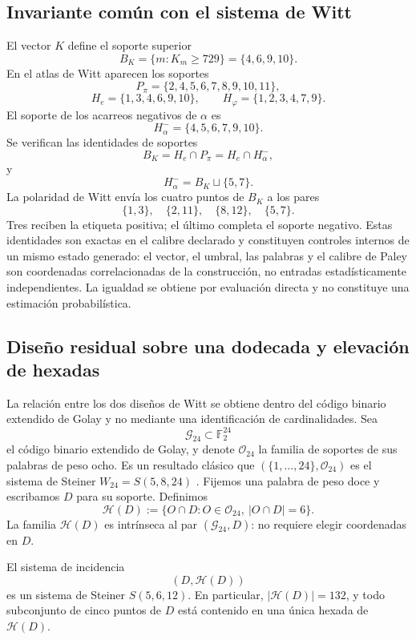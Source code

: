 \subsection{Invariante común con el sistema de Witt}

El vector \(K\) define el soporte superior
\[
B_K=\{m:K_m\ge729\}=\{4,6,9,10\}.
\]
En el atlas de Witt aparecen los soportes
\[
P_\pi=\{2,4,5,6,7,8,9,10,11\},
\]
\[
H_e=\{1,3,4,6,9,10\},
\qquad
H_\varphi=\{1,2,3,4,7,9\}.
\]
El soporte de los acarreos negativos de \(\alpha\) es
\[
H_\alpha^-=\{4,5,6,7,9,10\}.
\]
Se verifican las identidades de soportes
\[
\boxed{
B_K=H_e\cap P_\pi=H_e\cap H_\alpha^-,}
\]
y
\[
\boxed{H_\alpha^-=B_K\sqcup\{5,7\}.}
\]
La polaridad de Witt envía los cuatro puntos de \(B_K\) a los pares
\[
\{1,3\},\quad\{2,11\},\quad\{8,12\},\quad\{5,7\}.
\]
Tres reciben la etiqueta positiva; el último completa el soporte negativo.
Estas identidades son exactas en el calibre declarado y constituyen controles
internos de un mismo estado generado: el vector, el umbral, las palabras y el
calibre de Paley son coordenadas correlacionadas de la construcción, no
entradas estadísticamente independientes. La igualdad se obtiene por
evaluación directa y no constituye una estimación probabilística.

\subsection{Diseño residual sobre una dodecada y elevación de hexadas}
\label{p12-83-c17-s1:sec:w12-w24-elevacion}

La relación entre los dos diseños de Witt se obtiene dentro del código
binario extendido de Golay y no mediante una identificación de cardinalidades.
Sea
\[
\mathcal G_{24}\subset\mathbb F_2^{24}
\]
el código binario extendido de Golay, y denote \(\mathcal O_{24}\) la familia
de soportes de sus palabras de peso ocho. Es un resultado clásico que
\((\{1,\ldots,24\},\mathcal O_{24})\) es el sistema de Steiner
\(W_{24}=S(5,8,24)\) \cite{MacWilliamsSloane1977,ConwaySloane1999}.
Fijemos una palabra de peso doce y escribamos \(D\) para su soporte. Definimos
\begin{equation}
 \mathcal H(D)
 :=\{O\cap D:O\in\mathcal O_{24},\ |O\cap D|=6\}.
 \label{p12-83-c17-s1:eq:hexadas-residuales-dodecada}
\end{equation}
La familia \(\mathcal H(D)\) es intrínseca al par
\((\mathcal G_{24},D)\): no requiere elegir coordenadas en \(D\).

\begin{theorem}
\label{p12-83-c17-s1:thm:dodecada-w12}
El sistema de incidencia
\[
 (D,\mathcal H(D))
\]
es un sistema de Steiner \(S(5,6,12)\). En particular,
\(|\mathcal H(D)|=132\), y todo subconjunto de cinco puntos de \(D\) está
contenido en una única hexada de \(\mathcal H(D)\).
\end{theorem}


